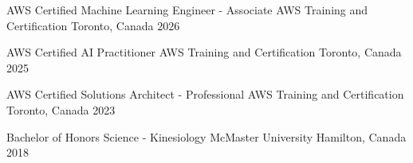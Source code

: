 
\begin{cvhonors}

  \cvhonor
    {AWS Certified Machine Learning Engineer - Associate}
    {AWS Training and Certification}
    {Toronto, Canada}
    {2026}

  \cvhonor
    {AWS Certified AI Practitioner}
    {AWS Training and Certification}
    {Toronto, Canada}
    {2025}

  \cvhonor
    {AWS Certified Solutions Architect - Professional}
    {AWS Training and Certification}
    {Toronto, Canada}
    {2023}

  \cvhonor
    {Bachelor of Honors Science - Kinesiology}
    {McMaster University}
    {Hamilton, Canada}
    {2018}

\end{cvhonors}
